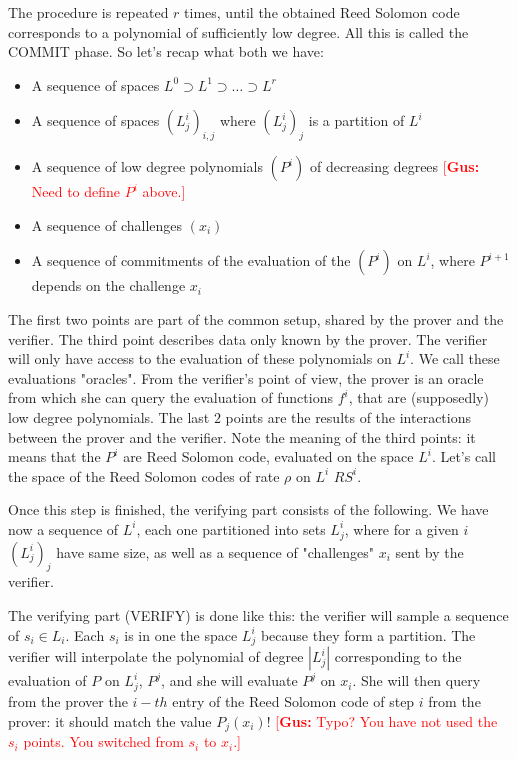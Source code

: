 \documentclass[12pt]{extarticle}
\newcommand{\<}{\langle}
\renewcommand{\>}{\rangle}
\theoremstyle{definition}
\newcommand{\gus}[1]{\textcolor{red}{[\textbf{Gus:} #1]}}
\begin{document}
The procedure is repeated $r$ times, until the obtained Reed Solomon code corresponds to a polynomial of sufficiently low degree. All this is called the COMMIT phase. So let's recap what both we have:
\begin{itemize}
    \item A sequence of spaces $L^0\supset L^1\supset\dots\supset L^r$
    \item A sequence of spaces $(L^i_j)_{i,j}$ where $(L^i_j)_j$ is a partition of $L^i$
    \item A sequence of low degree polynomials $(P^i)$ of decreasing degrees \gus{Need to define $P^i$ above.}
    \item A sequence of challenges $(x_i)$
    \item A sequence of commitments of the evaluation of the $(P^i)$ on $L^i$, where $P^{i+1}$ depends on the challenge $x_i$
\end{itemize}
The first two points are part of the common setup, shared by the prover and the verifier. The third point describes data only known by the prover. The verifier will only have access to the evaluation of these polynomials on $L^i$. We call these evaluations "oracles". From the verifier's point of view, the prover is an oracle from which she can query the evaluation of functions $f^i$, that are (supposedly) low degree polynomials. The last $2$ points are the results of the interactions between the prover and the verifier. Note the meaning of the third points: it means that the $P^i$ are Reed Solomon code, evaluated on the space $L^i$. Let's call the space of the Reed Solomon codes of rate $\rho$ on $L^i$ $RS^i$.

Once this step is finished, the verifying part consists of the following. We have now a sequence of $L^i$, each one partitioned into sets $L^i_j$, where for a given $i$ $(L^i_j)_j$ have same size, as well as a sequence of "challenges" $x_i$ sent by the verifier.

The verifying part (VERIFY) is done like this: the verifier will sample a sequence of $s_i\in L_i$. Each $s_i$ is in one the space $L^i_j$ because they form a partition. The verifier will interpolate the polynomial of degree $|L^i_j|$ corresponding to the evaluation of $P$ on $L^i_j$, $P^j$, and she will evaluate $P^j$ on $x_i$. She will then query from the prover the $i-th$ entry of the Reed Solomon code of step $i$ from the prover: it should match the value $P_j(x_i)$!
\gus{Typo? You have not used the $s_i$ points.  You switched from $s_i$ to $x_i$.}
\end{document}
